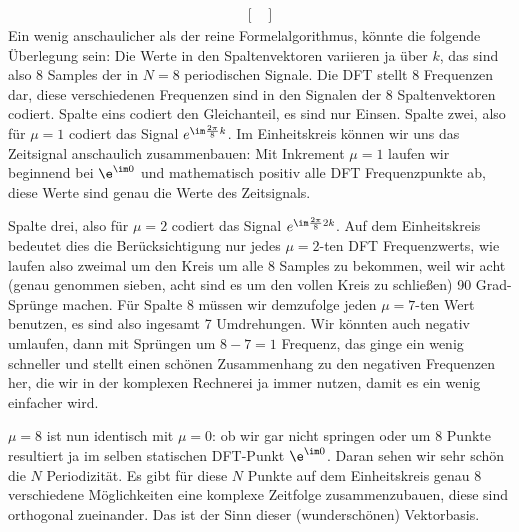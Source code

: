 \begin{Ansatz}
\begin{align}
{\begin{bmatrix}
\end{bmatrix}
}
\end{align}
%
Ein wenig anschaulicher als der reine Formelalgorithmus, könnte die folgende
Überlegung sein:
%
Die Werte in den Spaltenvektoren variieren ja über $k$,
das sind also 8 Samples der in $N=8$ periodischen Signale.
Die DFT stellt 8 Frequenzen dar, diese verschiedenen Frequenzen sind in den
Signalen der 8 Spaltenvektoren codiert.
Spalte eins codiert den Gleichanteil, es sind nur Einsen.
%
Spalte zwei, also für $\mu=1$ codiert das Signal $e^{\im\frac{2\pi}{8} k}$.
Im Einheitskreis können wir uns das Zeitsignal anschaulich zusammenbauen:
Mit Inkrement $\mu=1$ laufen wir beginnend bei
$\e^{\im 0}$ und mathematisch positiv alle DFT Frequenzpunkte
ab, diese Werte sind genau die Werte des Zeitsignals.

Spalte drei, also für $\mu=2$ codiert das Signal $e^{\im\frac{2\pi}{8} 2 k}$.
Auf dem Einheitskreis bedeutet dies die Berücksichtigung nur jedes $\mu=2$-ten
DFT Frequenzwerts, wie laufen also zweimal um den Kreis um alle 8 Samples zu
bekommen, weil wir acht (genau genommen sieben, acht sind es um den vollen
Kreis zu schließen) 90 Grad-Sprünge machen.
Für Spalte 8 müssen wir demzufolge jeden $\mu=7$-ten Wert benutzen, es sind
also ingesamt 7 Umdrehungen. Wir könnten auch negativ umlaufen, dann mit
Sprüngen um $8-7=1$ Frequenz,
das ginge ein wenig schneller und stellt einen schönen Zusammenhang zu den
negativen Frequenzen her, die wir in der komplexen Rechnerei ja immer nutzen,
damit es ein wenig einfacher wird.

$\mu=8$ ist nun identisch mit $\mu=0$: ob wir gar nicht springen oder um 8
Punkte resultiert ja im selben statischen DFT-Punkt $\e^{\im 0}$. Daran sehen
wir sehr schön die $N$ Periodizität. Es gibt für diese $N$ Punkte auf dem
Einheitskreis genau 8 verschiedene Möglichkeiten eine komplexe Zeitfolge
zusammenzubauen, diese sind orthogonal zueinander.
Das ist der Sinn dieser (wunderschönen) Vektorbasis.
%
\end{Ansatz}

